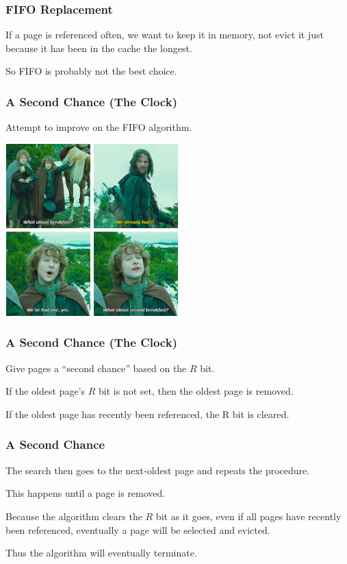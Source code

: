 \begin{frame}
\frametitle{FIFO Replacement}

If a page is referenced often, we want to keep it in memory, not evict it just because it has been in the cache the longest. 

So FIFO is probably not the best choice.

\end{frame}

\begin{frame}
\frametitle{A Second Chance (The Clock)}

Attempt to improve on the FIFO algorithm.

\begin{center}
	\includegraphics[width=0.5\textwidth]{images/secondbreakfast.jpg}
\end{center}

\end{frame}

\begin{frame}
\frametitle{A Second Chance (The Clock)}


Give pages a ``second chance'' based on the $R$ bit.

If the oldest page's $R$ bit is not set, then the oldest page is removed. 

If the oldest page has recently been referenced, the R bit is cleared.

\end{frame}

\begin{frame}
\frametitle{A Second Chance}

The search then goes to the next-oldest page and repeats the procedure. 

This happens until a page is removed. 

Because the algorithm clears the $R$ bit as it goes, even if all pages have recently been referenced, eventually a page will be selected and evicted. 

Thus the algorithm will eventually terminate. 

\end{frame}

